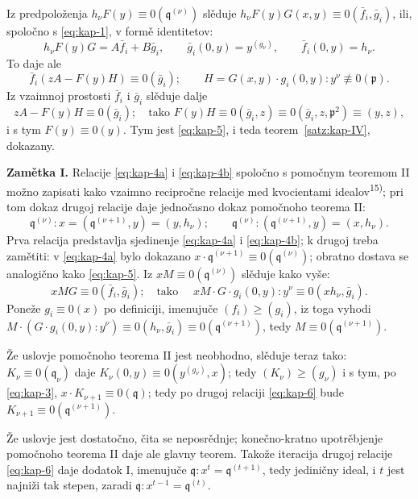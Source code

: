 \documentclass[11pt]{article}
\theoremstyle{plain}
\begin{document}
Iz predpoloženja $h_{\nu}F(y) \equiv 0(\mathfrak{q}^{(\nu)})$
slěduje
$h_{\nu}F(y)G(x,y) \equiv 0(\bar{f}_{i}, \bar{g}_{i})$, ili, spoločno
s \eqref{eq:kap-1}, v formě identitetov:
\[
h_{\nu}F(y)G = A\bar{f}_{i} + B\bar{g}_{i}, \qquad
\bar{g}_{i}(0,y) = y^{(g_{\nu})}, \qquad
\bar{f}_{i}(0,y) = h_{\nu}.
\]
To daje ale
\[
\bar{f}_{i}(zA - F(y)H) \equiv 0(\bar{g}_{i}); \qquad
H = G(x,y) \cdot g_{i}(0,y) : y^{\nu} \not\equiv 0(\mathfrak{p}).
\]
Iz vzaimnoj prostosti $\bar{f}_{i}$ i $\bar{g}_{i}$ slěduje dalje
\[
zA - F(y)H \equiv 0(\bar{g}_{i}); \quad \text{tako } F(y)H \equiv 0(\bar{g}_{i}, z)
\equiv 0(\bar{g}_{i}, z, \mathfrak{p}^{2}) \equiv (y, z),
\]
i s tym $F(y) \equiv 0(y)$. Tym jest \eqref{eq:kap-5}, i teda
teorem~\ref{satz:kap-IV}, dokazany.

\smallskip
\textbf{Zamětka I.} Relacije \eqref{eq:kap-4a} i
\eqref{eq:kap-4b} spoločno s pomočnym teoremom II možno zapisati
kako vzaimno recipročne relacije med kvocientami idealov\textsuperscript{15)};
pri tom dokaz drugoj relacije daje jednočasno dokaz pomočnoho
teorema II:
\begin{equation}\label{eq:kap-6}
\mathfrak{q}^{(\nu)} : x = (\mathfrak{q}^{(\nu+1)}, y) = (y, h_{\nu}); \qquad
\mathfrak{q}^{(\nu)} : (\mathfrak{q}^{(\nu+1)}, y) = (x, h_{\nu}).
\end{equation}
Prva relacija predstavlja sjedinenje \eqref{eq:kap-4a} i
\eqref{eq:kap-4b}; k drugoj treba zamětiti: v \eqref{eq:kap-4a}
bylo dokazano
$x \cdot \mathfrak{q}^{(\nu+1)} \equiv 0(\mathfrak{q}^{(\nu)})$;
obratno dostava se analogično kako \eqref{eq:kap-5}. Iz
$xM \equiv 0(\mathfrak{q}^{(\nu)})$ slěduje kako vyše:
\[
xMG \equiv 0(\bar{f}_{i}, \bar{g}_{i}); \quad \text{tako }\quad
xM \cdot G \cdot g_{i}(0,y) : y^{\nu} \equiv 0(xh_{\nu}, \bar{g}_{i}).
\]
Poneže $g_{i} \equiv 0(x)$ po definiciji, imenujuče
$(f_{i}) \geq (g_{i})$, iz toga vyhodi
$M \cdot (G \cdot g_{i}(0,y) : y^{\nu}) \equiv 0(h_{\nu}, \bar{g}_{i})
\equiv 0(\mathfrak{q}^{(\nu+1)})$, tedy
$M \equiv 0(\mathfrak{q}^{(\nu+1)})$.

Že uslovje pomočnoho teorema II jest neobhodno, slěduje teraz tako:
$K_{\nu} \equiv 0(\mathfrak{q}_{\nu})$ daje
$K_{\nu}(0,y) \equiv 0(y^{(g_{\nu})}, x)$; tedy
$(K_{\nu}) \geq (g_{\nu})$ i s tym, po \eqref{eq:kap-3},
$x \cdot K_{\nu+1} \equiv 0(\mathfrak{q})$; tedy po drugoj relaciji
\eqref{eq:kap-6} bude
$K_{\nu+1} \equiv 0(\mathfrak{q}^{(\nu+1)})$.

Že uslovje jest dostatočno, čita se neposrědnje; konečno-kratno
upotrěbjenje pomočnoho teorema II daje ale glavny teorem. Takože
iteracija drugoj relacije \eqref{eq:kap-6} daje dodatok I, imenujuče
$\mathfrak{q} : x^{t} = \mathfrak{q}^{(t+1)}$, tedy jediničny
ideal, i $t$ jest najniži tak stepen, zaradi
$\mathfrak{q} : x^{t-1} = \mathfrak{q}^{(t)}$.
\end{document}
